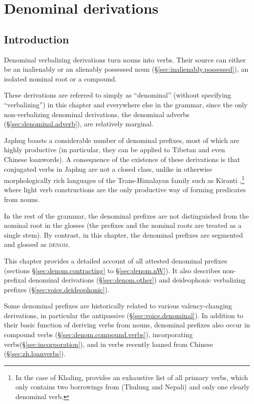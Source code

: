 \chapter{Denominal derivations} \label{chap:denominal}


\section{Introduction}
Denominal verbalizing derivations  turn nouns into verbs. Their source can either be an inalienably or an alienably possessed noun (§\ref{sec:inalienably.possessed}), an isolated nominal root or a compound.

These derivations are referred to simply as ``denominal'' (without specifying ``verbalizing'') in this chapter and everywhere else in the grammar, since the only non-verbalizing denominal derivations, the denominal adverbs  (§\ref{sec:denominal.adverb}), are relatively marginal.

Japhug boasts a considerable number of denominal prefixes, most of which are highly productive (in particular, they can be applied to Tibetan and even Chinese loanwords). A consequence of the existence of these derivations is that conjugated verbs in Japhug are not a closed class, unlike in otherwise morphologically rich languages of the Trans-Hima\-la\-yan family such as Kiranti \citep{jacques17pkiranti},\footnote{In the case of Khaling, \citet{jacques15khaling} provides an exhaustive list of all primary verbs, which only contains two borrowings from (Thulung and Nepali) and only one clearly denominal verb.} where light verb constructions are the only productive way of forming predicates from nouns.

In the rest of the grammar, the denominal prefixes are not distinguished from the nominal root in the glosses  (the prefixes and the nominal roots are treated as a single stem). By contrast, in this chapter, the denominal prefixes are segmented and glossed as \textsc{denom}.

This chapter provides a detailed account of all attested denominal prefixes (sections §\ref{sec:denom.contracting} to §\ref{sec:denom.nW}). It also describes non-prefixal denominal derivations (§\ref{sec:denom.other}) and  deideophonic verbalizing prefixes (§\ref{sec:voice.deideophonic}).

 Some denominal  prefixes are historically related to  various valency-changing derivations, in particular the antipassive (§\ref{sec:voice.denominal}).  In addition to their basic function of deriving verbs from nouns, denominal prefixes also occur in compound verbs (§\ref{sec:denom.compound.verbs}), incorporating  verbs(§\ref{sec:incorporation}), and in verbs recently loaned from Chinese (§\ref{sec:zh.loanverbs}).

